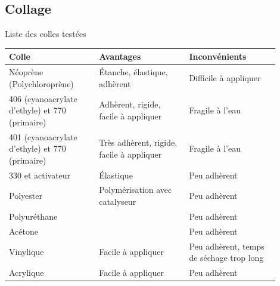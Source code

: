 \subsection{Collage}

\begin{frame}{Liste des colles testées}
	\begin{tabular}{|p{0.3\linewidth}|p{0.3\linewidth}|p{0.3\linewidth}|}
		\hline
		Colle & Avantages & Inconvénients \\
		\hline

		\rowcolor{OrangeT}
		Néoprène (Polychloroprène) &
		Étanche, élastique, adhèrent &
		Difficile à appliquer \\
		\hline

		\rowcolor{OrangeT}
		406 (cyanoacrylate d'ethyle) et 770 (primaire) &
		Adhèrent, rigide, facile à appliquer &
		Fragile à l'eau \\
		\hline

		\rowcolor{GreenT}
		401 (cyanoacrylate d'ethyle) et 770 (primaire) &
		Très adhèrent, rigide, facile à appliquer &
		Fragile à l'eau \\
		\hline

		\rowcolor{RedT}
		330 et activateur &
		Élastique &
		Peu adhèrent \\
		\hline

		\rowcolor{RedT}
		Polyester &
		Polymérisation avec catalyseur &
		Peu adhèrent \\
		\hline
		
		\rowcolor{RedT}
		Polyuréthane &
		& Peu adhèrent \\
		\hline

		\rowcolor{RedT}
		Acétone &
		& Peu adhèrent \\
		\hline
		
		\rowcolor{RedT}
		Vinylique &
		Facile à appliquer &
		Peu adhèrent, temps de séchage trop long \\
		\hline

		\rowcolor{RedT}
		Acrylique &
		Facile à appliquer &
		Peu adhèrent \\
		\hline

	\end{tabular}
\end{frame}

